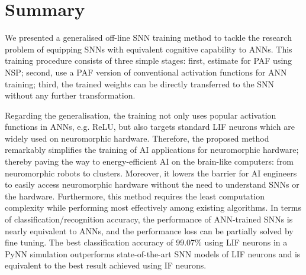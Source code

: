 \section{Summary}
	We presented a generalised off-line SNN training method to tackle the research problem of equipping SNNs with equivalent cognitive capability to ANNs.
	This training procedure consists of three simple stages: first, estimate \DIFdelbegin {}\DIFdelend \DIFaddbegin {}\DIFaddend for PAF using NSP; second, use a PAF version of conventional activation functions for ANN training; %
	third, the trained weights can be directly transferred to the SNN without any further transformation.
	\DIFdelbegin {}\DIFdelend 

	
	
	Regarding the generalisation, the training not only uses popular activation functions in ANNs, e.g. ReLU, but also targets standard LIF neurons which are widely used on neuromorphic hardware.
	Therefore, the proposed method remarkably simplifies the training of AI applications for neuromorphic hardware;
	thereby paving the way to energy-efficient AI on the brain-like computers: from neuromorphic robots to clusters.
	Moreover, it lowers the barrier for AI engineers to easily access neuromorphic hardware without the need to understand SNNs or the hardware.
	Furthermore, this method requires the least computation complexity while performing most effectively among existing algorithms.
	In terms of classification/recognition accuracy, the performance of ANN-trained SNNs is nearly equivalent to ANNs, and the performance loss can be partially solved by fine tuning.
	The best classification accuracy of 99.07\% using LIF neurons in a PyNN simulation outperforms state-of-the-art SNN models of LIF neurons and is equivalent to the best result achieved using IF neurons\DIFaddbegin {}\DIFaddend .
